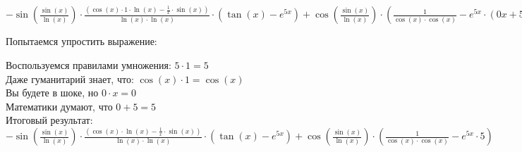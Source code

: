 \documentclass[12pt]{article}
\begin{document}
$ -\sin (\frac{\sin (x) } {\ln (x)} ) \cdot \frac{(\cos (x) \cdot 1\cdot \ln (x) - \frac{1} {x} \cdot \sin (x) ) } {\ln (x)\cdot \ln (x)} \cdot (\tan (x)  - e^{5x})  + \cos (\frac{\sin (x) } {\ln (x)} ) \cdot (\frac{1} {\cos (x) \cdot \cos (x) }  - e^{5x}\cdot (0x + 5\cdot 1) ) $

Попытаемся упростить выражение: 

Воспользуемся правилами умножения: $5 \cdot 1 = 5$ \\ 
Даже гуманитарий знает, что: $ \cos (x)  \cdot 1 = \cos (x) $ \\ 
 Вы будете в шоке, но $ 0 \cdot x = 0$ \\ 
 Математики думают, что $0 + 5 = 5$ \\ 
 Итоговый результат: \\ 
$ -\sin (\frac{\sin (x) } {\ln (x)} ) \cdot \frac{(\cos (x) \cdot \ln (x) - \frac{1} {x} \cdot \sin (x) ) } {\ln (x)\cdot \ln (x)} \cdot (\tan (x)  - e^{5x})  + \cos (\frac{\sin (x) } {\ln (x)} ) \cdot (\frac{1} {\cos (x) \cdot \cos (x) }  - e^{5x}\cdot 5) $
\end{document}
